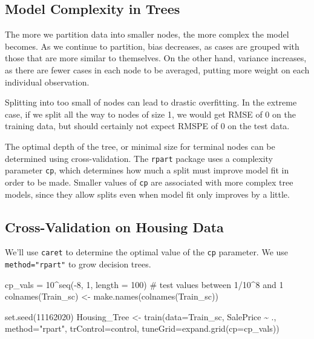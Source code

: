 \documentclass[
  letterpaper,
  DIV=11,
  numbers=noendperiod]{scrreprt}
\newenvironment{Shaded}{\begin{snugshade}}{\end{snugshade}}
\newcommand{\AttributeTok}[1]{\textcolor[rgb]{0.40,0.45,0.13}{#1}}
\newcommand{\CommentTok}[1]{\textcolor[rgb]{0.37,0.37,0.37}{#1}}
\newcommand{\DecValTok}[1]{\textcolor[rgb]{0.68,0.00,0.00}{#1}}
\newcommand{\FunctionTok}[1]{\textcolor[rgb]{0.28,0.35,0.67}{#1}}
\newcommand{\NormalTok}[1]{\textcolor[rgb]{0.00,0.23,0.31}{#1}}
\newcommand{\OtherTok}[1]{\textcolor[rgb]{0.00,0.23,0.31}{#1}}
\newcommand{\SpecialCharTok}[1]{\textcolor[rgb]{0.37,0.37,0.37}{#1}}
\newcommand{\StringTok}[1]{\textcolor[rgb]{0.13,0.47,0.30}{#1}}
\begin{document}
\subsection{Model Complexity in Trees}\label{model-complexity-in-trees}

The more we partition data into smaller nodes, the more complex the
model becomes. As we continue to partition, bias decreases, as cases are
grouped with those that are more similar to themselves. On the other
hand, variance increases, as there are fewer cases in each node to be
averaged, putting more weight on each individual observation.

Splitting into too small of nodes can lead to drastic overfitting. In
the extreme case, if we split all the way to nodes of size 1, we would
get RMSE of 0 on the training data, but should certainly not expect
RMSPE of 0 on the test data.

The optimal depth of the tree, or minimal size for terminal nodes can be
determined using cross-validation. The \texttt{rpart} package uses a
complexity parameter \texttt{cp}, which determines how much a split must
improve model fit in order to be made. Smaller values of \texttt{cp} are
associated with more complex tree models, since they allow splits even
when model fit only improves by a little.

\subsection{Cross-Validation on Housing
Data}\label{cross-validation-on-housing-data}

We'll use \texttt{caret} to determine the optimal value of the
\texttt{cp} parameter. We use \texttt{method="rpart"} to grow decision
trees.

\begin{Shaded}
\begin{Highlighting}[]
\NormalTok{cp\_vals }\OtherTok{=} \DecValTok{10}\SpecialCharTok{\^{}}\FunctionTok{seq}\NormalTok{(}\SpecialCharTok{{-}}\DecValTok{8}\NormalTok{, }\DecValTok{1}\NormalTok{, }\AttributeTok{length =} \DecValTok{100}\NormalTok{) }\CommentTok{\# test values between 1/10\^{}8 and 1}
\FunctionTok{colnames}\NormalTok{(Train\_sc) }\OtherTok{\textless{}{-}} \FunctionTok{make.names}\NormalTok{(}\FunctionTok{colnames}\NormalTok{(Train\_sc))}

\FunctionTok{set.seed}\NormalTok{(}\DecValTok{11162020}\NormalTok{)}
\NormalTok{Housing\_Tree }\OtherTok{\textless{}{-}} \FunctionTok{train}\NormalTok{(}\AttributeTok{data=}\NormalTok{Train\_sc, SalePrice }\SpecialCharTok{\textasciitilde{}}\NormalTok{ .,  }\AttributeTok{method=}\StringTok{"rpart"}\NormalTok{, }\AttributeTok{trControl=}\NormalTok{control, }
                     \AttributeTok{tuneGrid=}\FunctionTok{expand.grid}\NormalTok{(}\AttributeTok{cp=}\NormalTok{cp\_vals))}
\end{Highlighting}
\end{Shaded}
\end{document}
